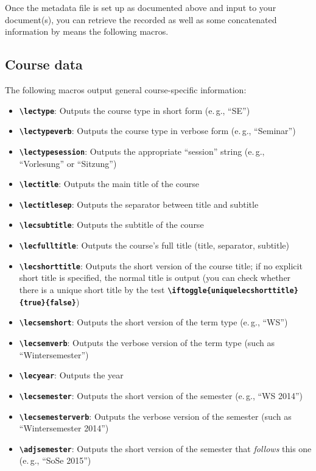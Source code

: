 \documentclass[english]{article}
\newcommand*\jmacro[1]{\textbf{\texttt{#1}}}
\newcommand*\jcsmacro[1]{\jmacro{\textbackslash{#1}}}
\newcommand*\jparam[1]{\angus #1\angud}
\begin{document}
Once the metadata file is set up as documented above and input to
your document(s), you can retrieve the recorded as well as some concatenated
information by means the following macros.


\subsection{Course data}\label{sec:csdata}

The following macros output general course-specific information:
\begin{itemize}
\item \jcsmacro{lectype}: Outputs the course type in short
form (e.\,g., ``SE'')
\item \jcsmacro{lectypeverb}: Outputs the course type in
verbose form (e.\,g., ``Seminar'')
\item \jcsmacro{lectypesession}: Outputs the appropriate
``session'' string (e.\,g., ``Vorlesung'' or ``Sitzung'')
\item \jcsmacro{lectitle}: Outputs the main title of the
course
\item \jcsmacro{lectitlesep}: Outputs the separator between
title and subtitle
\item \jcsmacro{lecsubtitle}: Outputs the subtitle of the course
\item \jcsmacro{lecfulltitle}: Outputs the course's full title
    (title, separator, subtitle)
\item \jcsmacro{lecshorttitle}: Outputs the short version
of the course title; if no explicit short title is specified,
the normal title is output (you can check whether
there is a unique short title by the test
\jcsmacro{iftoggle\{uniquelecshorttitle\}\{\jparam{true}\}\{\jparam{false}\}})
\item \jcsmacro{lecsemshort}: Outputs the short version of
the term type (e.\,g., ``WS'')
\item \jcsmacro{lecsemverb}: Outputs the verbose version
of the term type (such as ``Winter\-semester'')
\item \jcsmacro{lecyear}: Outputs the year
\item \jcsmacro{lecsemester}: Outputs the short version of
the semester (e.\,g., ``WS 2014'')
\item \jcsmacro{lecsemesterverb}: Outputs the verbose version
of the semester (such as ``Winter\-semester 2014'')
\item \jcsmacro{adjsemester}: Outputs the short version of
the semester that \emph{follows} this one (e.\,g., ``SoSe 2015'')

\end{itemize}
\end{document}
